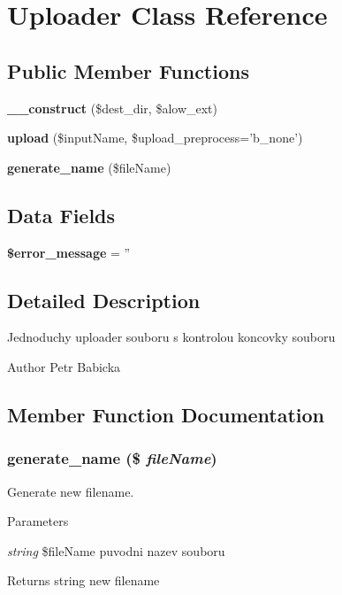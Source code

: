 \section{Uploader Class Reference}
\label{class_uploader}
\subsection*{Public Member Functions}
\begin{DoxyCompactItemize}
\item 
{\bfseries \_\-\_\-construct} (\$dest\_\-dir, \$alow\_\-ext)\label{class_uploader_ae1a052bcca50ede168f0322681d07816}

\item 
{\bf upload} (\$inputName, \$upload\_\-preprocess='b\_\-none')
\item 
{\bf generate\_\-name} (\$fileName)
\end{DoxyCompactItemize}
\subsection*{Data Fields}
\begin{DoxyCompactItemize}
\item 
{\bfseries \$error\_\-message} = ''\label{class_uploader_ae838cbd355959defbd4d49d0fbe7b273}

\end{DoxyCompactItemize}


\subsection{Detailed Description}
Jednoduchy uploader souboru s kontrolou koncovky souboru \begin{DoxyAuthor}{Author}
Petr Babicka 
\end{DoxyAuthor}


\subsection{Member Function Documentation}
\subsubsection[{generate\_\-name}]{\setlength{\rightskip}{0pt plus 5cm}generate\_\-name (\$ {\em fileName})}\label{class_uploader_ae190252d35464175e51cdd3cf430e534}
Generate new filename. 
\begin{DoxyParams}{Parameters}
\item[{\em string}]\$fileName puvodni nazev souboru \end{DoxyParams}
\begin{DoxyReturn}{Returns}
string new filename 
\end{DoxyReturn}
